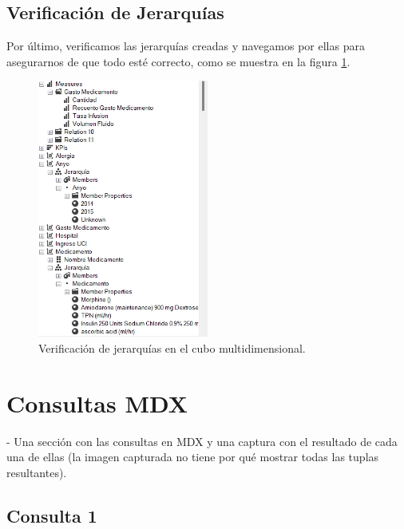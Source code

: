 \documentclass{article}
\begin{document}
\subsection{Verificación de Jerarquías}
Por último, verificamos las jerarquías creadas y navegamos por ellas para asegurarnos de que todo esté correcto, como se muestra en la figura \ref{fig:jerarquia}. 

\begin{figure}[H]
	\begin{center}
		\includegraphics[width=0.5\textwidth]{images/navegacion.png}
		\caption{Verificación de jerarquías en el cubo multidimensional.}
		\label{fig:jerarquia}
	\end{center}
\end{figure}





	
	
	
	
	
	
	
	
	
	
	\section{Consultas MDX}
	- Una sección con las consultas en MDX y una captura con el resultado de cada una de ellas (la imagen capturada no tiene por qué mostrar todas las tuplas resultantes). 

\subsection{Consulta 1}
\end{document}

